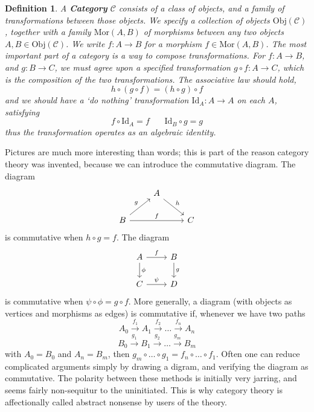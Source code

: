 \documentclass{article}
\theoremstyle{plain}
\newtheorem{definition}{Definition}
\begin{document}
\begin{definition}
    A {\bf Category} $\mathcal{C}$ consists of a class of objects, and a family of transformations between those objects. We specify a collection of objects $\text{Obj}(\mathcal{C})$, together with a family $\text{Mor}(A,B)$ of {\it morphisms} between any two objects $A,B \in \text{Obj}(\mathcal{C})$. We write $f: A \to B$ for a morphism $f \in \text{Mor}(A,B)$. The most important part of a category is a way to compose transformations. For $f: A \to B$, and $g: B \to C$, we must agree upon a specified transformation $g \circ f: A \to C$, which is the composition of the two transformations. The associative law should hold,
    \[ h \circ (g \circ f) = (h \circ g) \circ f \]
    and we should have a `do nothing' transformation $\text{Id}_A: A \to A$ on each $A$, satisfying
    \[ f \circ \text{Id}_A = f\ \ \ \ \ \ \ \ \text{Id}_B \circ g = g \]
    thus the transformation operates as an algebraic identity.
\end{definition}

Pictures are much more interesting than words; this is part of the reason category theory was invented, because we can introduce the commutative diagram. The diagram
%
\[
\begin{tikzcd}
     & A \arrow{rd}{h} & \\
    B \arrow{ru}{g} \arrow{rr}{f} & & C
\end{tikzcd}
\]
%
is commutative when $h \circ g = f$. The diagram
%
\[
\begin{tikzcd}
    A \arrow{d}{\phi} \arrow{r}{f} & B \arrow{d}{g}\\
    C \arrow{r}{\psi} & D
\end{tikzcd}
\]
%
is commutative when $\psi \circ \phi = g \circ f$. More generally, a diagram (with objects as vertices and morphisms as edges) is commutative if, whenever we have two paths
%
\[ A_0 \xrightarrow{f_1} A_1 \xrightarrow{f_2} \dots \xrightarrow{f_n} A_n \]
\[ B_0 \xrightarrow{g_1} B_1 \xrightarrow{g_2} \dots \xrightarrow{g_m} B_m \]
%
with $A_0 = B_0$ and $A_n = B_m$, then $g_m \circ \dots \circ g_1 = f_n \circ \dots \circ f_1$. Often one can reduce complicated arguments simply by drawing a digram, and verifying the diagram as commutative. The polarity between these methods is initially very jarring, and seems fairly non-sequitur to the uninitiated. This is why category theory is affectionally called abstract nonsense by users of the theory.
\end{document}
